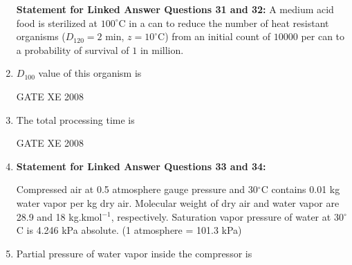 \documentclass[12pt]{article}
\begin{document}
\begin{enumerate}
  
\textbf{ Statement for Linked Answer Questions 31 and 32:  }
A medium acid food is sterilized at $100^\circ$C in a can to reduce the number of heat resistant organisms ($D_{120} = 2$ min, $z = 10^\circ$C) from an initial count of $10000$ per can to a probability of survival of $1$ in million.  

\item $D_{100}$ value of this organism is 

\begin{enumerate}
\end{enumerate}

GATE XE 2008  

\item The total processing time is  

\begin{enumerate}
\end{enumerate}

GATE XE 2008  

\item[] \textbf{Statement for Linked Answer Questions 33 and 34:}

Compressed air at 0.5 atmosphere gauge pressure and 30$^\circ$C contains 0.01 kg water vapor per kg dry air. Molecular weight of dry air and water vapor are 28.9 and 18 kg.kmol$^{-1}$, respectively. Saturation vapor pressure of water at 30$^\circ$C is 4.246 kPa absolute. (1 atmosphere = 101.3 kPa) \\

\item Partial pressure of water vapor inside the compressor is 

\begin{enumerate}
\end{enumerate}


\end{enumerate}
\end{document}
